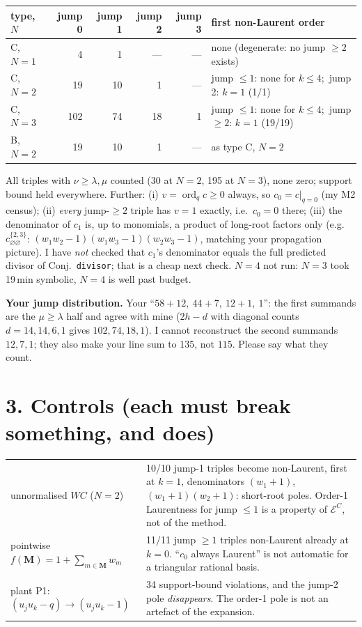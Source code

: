 \documentclass[10pt]{article}
\begin{document}
\begin{center}
\begin{tabular}{@{}lrrrrl@{}}\toprule
type, $N$ & jump 0 & jump 1 & jump 2 & jump 3 & first non-Laurent order\\\midrule
C, $N=1$ & 4 & 1 & --- & --- & none (degenerate: no jump $\ge2$ exists)\\
C, $N=2$ & 19 & 10 & 1 & --- & jump $\le1$: none for $k\le4$;\ jump 2: $k=1$ (1/1)\\
C, $N=3$ & 102 & 74 & 18 & 1 & jump $\le1$: none for $k\le4$;\ jump $\ge2$: $k=1$ (19/19)\\
B, $N=2$ & 19 & 10 & 1 & --- & as type C, $N=2$\\\bottomrule
\end{tabular}
\end{center}
All triples with $\nu\ge\lambda,\mu$ counted (30 at $N=2$, 195 at $N=3$), none zero; support bound held everywhere. Further:
(i) $v=\operatorname{ord}_q c\ge0$ always, so $c_0=c|_{q=0}$ (my M2 census); (ii) \emph{every} jump-$\ge2$ triple has $v=1$
exactly, i.e.\ $c_0=0$ there; (iii) the denominator of $c_1$ is, up to monomials, a product of long-root factors only (e.g.\
$c^{\{2,3\}}_{\varnothing\varnothing}$: $(w_1w_2-1)(w_1w_3-1)(w_2w_3-1)$, matching your propagation picture). I have \emph{not} checked that
$c_1$'s denominator equals the full predicted divisor of Conj.~\texttt{divisor}; that is a cheap next check. $N=4$ not run: $N=3$ took
19\,min symbolic, $N=4$ is well past budget.

\textbf{Your jump distribution.} Your ``$58+12,\ 44+7,\ 12+1,\ 1$'': the first summands are the $\mu\ge\lambda$ half and agree with mine
($2h-d$ with diagonal counts $d=14,14,6,1$ gives $102,74,18,1$). I cannot reconstruct the second summands $12,7,1$; they also make
your line sum to $135$, not $115$. Please say what they count.

\section*{3. Controls (each must break something, and does)}
\begin{tabular}{@{}p{4.1cm}p{12.4cm}@{}}
unnormalised $WC$ ($N=2$) & 10/10 jump-1 triples become non-Laurent, first at $k=1$, denominators $(w_1+1)$, $(w_1+1)(w_2+1)$: short-root poles. Order-1 Laurentness for jump $\le1$ is a property of $\mathcal E^C$, not of the method.\\
pointwise $f(\mathbf M)=1+\sum_{m\in\mathbf M}w_m$ & 11/11 jump $\ge1$ triples non-Laurent already at $k=0$. ``$c_0$ always Laurent'' is not automatic for a triangular rational basis.\\
plant P1: $(u_ju_k-q)\to(u_ju_k-1)$ & 34 support-bound violations, and the jump-2 pole \emph{disappears}. The order-1 pole is not an artefact of the expansion.
\end{tabular}
\end{document}
